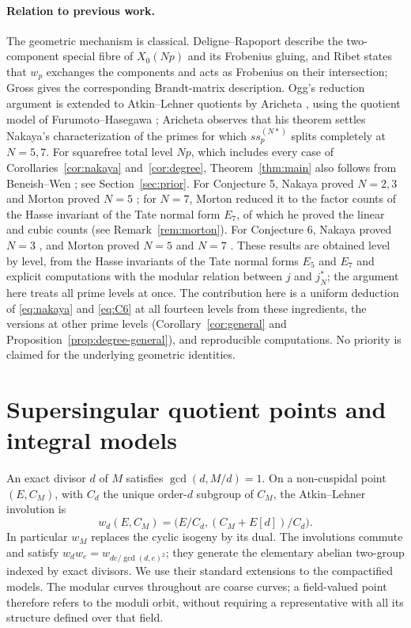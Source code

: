 \documentclass[11pt,a4paper]{article}
\theoremstyle{remark}\newtheorem{remark}[theorem]{Remark}
\numberwithin{equation}{section}
\begin{document}
	
	
	\paragraph{Relation to previous work.}
	The geometric mechanism is classical. Deligne--Rapoport \cite[VI, Theorem 6.9]{DR} describe the two-component special fibre of $X_0(Np)$ and its Frobenius gluing, and Ribet \cite[Proposition 3.8(i), p.~446]{Ribet} states that $w_p$ exchanges the components and acts as Frobenius on their intersection; Gross \cite[Proposition 2.7(3)]{Gross} gives the corresponding Brandt-matrix description. Ogg's reduction argument \cite{OggRed} is extended to Atkin--Lehner quotients by Aricheta \cite[Theorem 3.1]{Aricheta}, using the quotient model of Furumoto--Hasegawa \cite[Section 5]{FH}; Aricheta observes \cite[Section 1]{Aricheta} that his theorem settles Nakaya's characterization of the primes for which $ss_p^{(N*)}$ splits completely at $N=5,7$. For squarefree total level $Np$, which includes every case of Corollaries~\ref{cor:nakaya} and~\ref{cor:degree}, Theorem~\ref{thm:main} also follows from Beneish--Wen \cite[Theorem 6.5]{BW}; see Section~\ref{sec:prior}. For Conjecture 5, Nakaya proved $N=2,3$ \cite[Theorem 4]{Nakaya} and Morton proved $N=5$ \cite{Morton5a,Morton5b}; for $N=7$, Morton reduced it to the factor counts of the Hasse invariant of the Tate normal form $E_7$, of which he proved the linear and cubic counts \cite[Theorem A]{Morton7} (see Remark~\ref{rem:morton}). For Conjecture 6, Nakaya proved $N=3$ \cite{Nakaya}, and Morton proved $N=5$ \cite[Section 7]{Morton5b} and $N=7$ \cite[Section 3]{MortonFricke}. These results are obtained level by level, from the Hasse invariants of the Tate normal forms $E_5$ and $E_7$ and explicit computations with the modular relation between $j$ and $j_N^*$; the argument here treats all prime levels at once. The contribution here is a uniform deduction of \eqref{eq:nakaya} and \eqref{eq:C6} at all fourteen levels from these ingredients, the versions at other prime levels (Corollary~\ref{cor:general} and Proposition~\ref{prop:degree-general}), and reproducible computations. No priority is claimed for the underlying geometric identities.
	
	\section{Supersingular quotient points and integral models}\label{sec:prelim}
	An exact divisor $d$ of $M$ satisfies $\gcd(d,M/d)=1$. On a non-cuspidal point $(E,C_M)$, with $C_d$ the unique order-$d$ subgroup of $C_M$, the Atkin--Lehner involution is
	\[
	w_d(E,C_M)=\bigl(E/C_d,(C_M+E[d])/C_d\bigr).
	\]
	In particular $w_M$ replaces the cyclic isogeny by its dual. The involutions commute and satisfy $w_dw_e=w_{de/\gcd(d,e)^2}$; they generate the elementary abelian two-group indexed by exact divisors. We use their standard extensions to the compactified models. The modular curves throughout are coarse curves; a field-valued point therefore refers to the moduli orbit, without requiring a representative with all its structure defined over that field.
	
\end{document}
